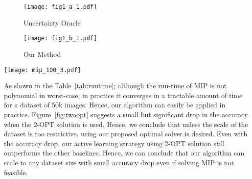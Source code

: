 \documentclass{article} \usepackage{iclr2018_conference,times}
\begin{document}
\begin{figure*}[tb]
    \begin{minipage}[t]{0.49\textwidth}
  \begin{center}
    \begin{subfigure}[b]{0.49\textwidth}
		\texttt{[image: fig1\_a\_1.pdf]}
		\caption{Uncertainty Oracle}
    \end{subfigure}
    \begin{subfigure}[b]{0.49\textwidth}
		\texttt{[image: fig1\_b\_1.pdf]}
		\caption{Our Method}
    \end{subfigure}
\end{center}
 \caption{tSNE embeddings of the CIFAR dataset and behavior of uncertainty oracle as well as our method. For both methods, the initial labeled pool of 1000 images are shown in blue, 1000 images chosen to be labeled in green and remaining ones in red. Our algorithm results in queries evenly covering the space. On the other hand, samples chosen by uncertainty oracle fails to cover the large portion of the space.}
\end{minipage} \quad
\begin{minipage}[t]{0.49\textwidth}
\vspace{-50mm}
\vspace{-2mm}
\setlength{\tabcolsep}{1mm}
\label{tab:runtime}

\vspace{4mm}

\texttt{[image: mip\_100\_3.pdf]}
\vspace{-2mm}
\label{fig:twoopt}
\end{minipage}
\end{figure*}


As shown in the Table~\ref{tab:runtime}; although the run-time of MIP is not polynomial in worst-case, in practice it
converges in a tractable amount of time for a dataset of 50k images. Hence, our algorithm can easily be applied in
practice. Figure~\ref{fig:twoopt} suggests a small but significant drop in the accuracy when the 2-OPT solution is used.
Hence, we conclude that unless the scale of the dataset is too restrictive, using our proposed optimal solver is
desired. Even with the accuracy drop, our active learning strategy using 2-OPT solution still outperforms the other
baselines. Hence, we can conclude that our algorithm can scale to any dataset size with small accuracy drop even if
solving MIP is not feasible.
\end{document}
